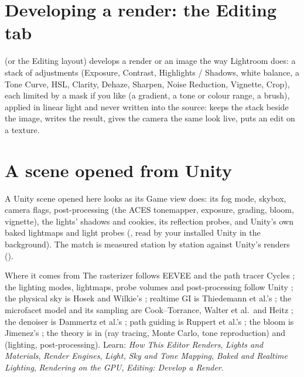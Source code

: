 \section{Developing a render: the Editing tab}
 (or the Editing layout) develops a render or an image the way Lightroom does: a stack of
adjustments (Exposure, Contrast, Highlights / Shadows, white balance, a Tone Curve, HSL, Clarity, Dehaze, Sharpen,
Noise Reduction, Vignette, Crop), each limited by a mask if you like (a gradient, a tone or colour range, a brush),
applied in linear light and never written into the source:  keeps the stack beside the image, 
writes the result,  gives the camera the same look live,  puts an edit on a
texture.

\section{A scene opened from Unity}
A Unity scene opened here looks as its Game view does: its fog mode, skybox, camera flags, post-processing (the ACES
tonemapper, exposure, grading, bloom, vignette), the lights' shadows and cookies, its reflection probes, and Unity's own
baked lightmaps and light probes (, read by your installed Unity in the
background). The match is measured station by station against Unity's renders ().

\begin{fromnote}{Where it comes from}
The rasterizer follows EEVEE and the path tracer Cycles \cite{Blender2026}; the lighting modes, lightmaps, probe
volumes and post-processing follow Unity \cite{UnityManual2026}; the physical sky is Hosek and Wilkie's
\cite{Hosek2012Analytic}; realtime GI is Thiedemann et al.'s \cite{Thiedemann2011Voxel}; the microfacet model and
its sampling are Cook--Torrance, Walter et al.\ and Heitz \cite{Cook1982Reflectance, Walter2007Microfacet,
Heitz2018Sampling}; the denoiser is Dammertz et al.'s \cite{Dammertz2010Edge}; path guiding is Ruppert et al.'s
\cite{Ruppert2020Robust}; the bloom is Jimenez's \cite{Jimenez2014}; the theory is in \cite{MarschnerShirley2021}
(ray tracing, Monte Carlo, tone reproduction) and \cite{Gregory2018vol2} (lighting, post-processing). Learn: \emph{How
This Editor Renders}, \emph{Lights and Materials}, \emph{Render Engines}, \emph{Light, Sky and Tone Mapping},
\emph{Baked and Realtime Lighting}, \emph{Rendering on the GPU}, \emph{Editing: Develop a Render}.
\end{fromnote}

